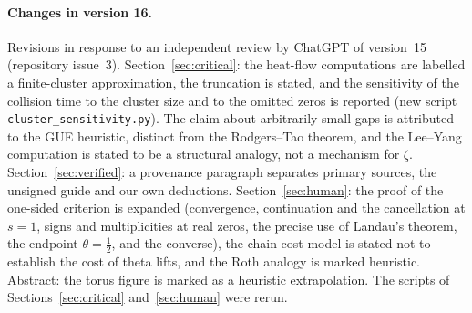 \documentclass[11pt,a4paper]{article}
\theoremstyle{definition}\newtheorem{definition}[proposition]{Definition}
\theoremstyle{remark}\newtheorem{remark}[proposition]{Remark}
\begin{document}
\paragraph{Changes in version 16.} Revisions in response to an independent review by ChatGPT of version~15 (repository issue~3). Section~\ref{sec:critical}: the heat-flow computations are labelled a finite-cluster approximation, the truncation is stated, and the sensitivity of the collision time to the cluster size and to the omitted zeros is reported (new script \texttt{cluster\_sensitivity.py}). The claim about arbitrarily small gaps is attributed to the GUE heuristic, distinct from the Rodgers--Tao theorem, and the Lee--Yang computation is stated to be a structural analogy, not a mechanism for $\zeta$. Section~\ref{sec:verified}: a provenance paragraph separates primary sources, the unsigned guide and our own deductions. Section~\ref{sec:human}: the proof of the one-sided criterion is expanded (convergence, continuation and the cancellation at $s=1$, signs and multiplicities at real zeros, the precise use of Landau's theorem, the endpoint $\theta=\tfrac12$, and the converse), the chain-cost model is stated not to establish the cost of theta lifts, and the Roth analogy is marked heuristic. Abstract: the torus figure is marked as a heuristic extrapolation. The scripts of Sections~\ref{sec:critical} and~\ref{sec:human} were rerun.
\end{document}
